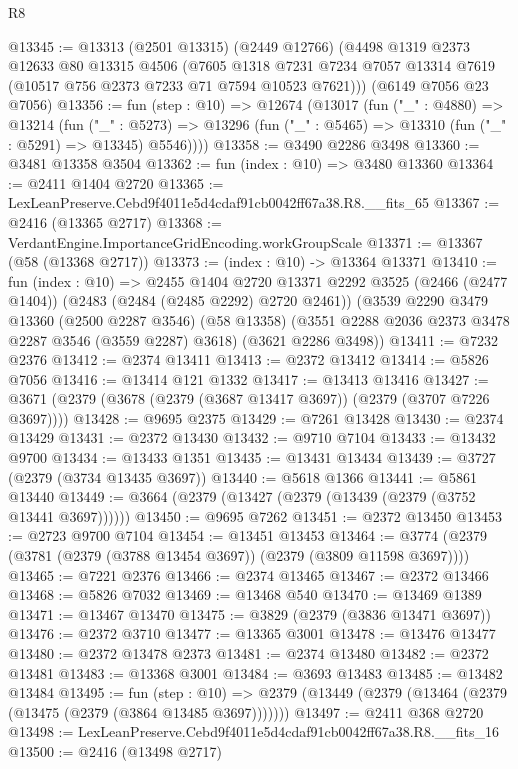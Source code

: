 \begin{lexlean}{R8}
\begin{coremodule}
@13345 := @13313
    (@2501 @13315)
    (@2449 @12766)
    (@4498
      @1319
      @2373
      @12633
      @80
      @13315
      @4506
      (@7605 @1318 @7231 @7234 @7057 @13314 @7619 (@10517 @756 @2373 @7233 @71 @7594 @10523 @7621)))
    (@6149 @7056 @23 @7056)
@13356 := fun (step : @10) =>
  @12674
    (@13017
      (fun ("_" : @4880) =>
      @13214
        (fun ("_" : @5273) =>
        @13296 (fun ("_" : @5465) => @13310 (fun ("_" : @5291) => @13345) @5546))))
@13358 := @3490 @2286 @3498
@13360 := @3481 @13358 @3504
@13362 := fun (index : @10) => @3480 @13360
@13364 := @2411 @1404 @2720
@13365 := LexLeanPreserve.Cebd9f4011e5d4cdaf91cb0042ff67a38.R8.__fits_65
@13367 := @2416 (@13365 @2717)
@13368 := VerdantEngine.ImportanceGridEncoding.workGroupScale
@13371 := @13367 (@58 (@13368 @2717))
@13373 := (index : @10) -> @13364 @13371
@13410 := fun (index : @10) =>
  @2455
    @1404
    @2720
    @13371
    @2292
    @3525
    (@2466 (@2477 @1404))
    (@2483 (@2484 (@2485 @2292) @2720 @2461))
    (@3539
      @2290
      @3479
      @13360
      (@2500 @2287 @3546)
      (@58 @13358)
      (@3551 @2288 @2036 @2373 @3478 @2287 @3546 (@3559 @2287) @3618)
      (@3621 @2286 @3498))
@13411 := @7232 @2376
@13412 := @2374 @13411
@13413 := @2372 @13412
@13414 := @5826 @7056
@13416 := @13414 @121 @1332
@13417 := @13413 @13416
@13427 := @3671 (@2379 (@3678 (@2379 (@3687 @13417 @3697)) (@2379 (@3707 @7226 @3697))))
@13428 := @9695 @2375
@13429 := @7261 @13428
@13430 := @2374 @13429
@13431 := @2372 @13430
@13432 := @9710 @7104
@13433 := @13432 @9700
@13434 := @13433 @1351
@13435 := @13431 @13434
@13439 := @3727 (@2379 (@3734 @13435 @3697))
@13440 := @5618 @1366
@13441 := @5861 @13440
@13449 := @3664 (@2379 (@13427 (@2379 (@13439 (@2379 (@3752 @13441 @3697))))))
@13450 := @9695 @7262
@13451 := @2372 @13450
@13453 := @2723 @9700 @7104
@13454 := @13451 @13453
@13464 := @3774 (@2379 (@3781 (@2379 (@3788 @13454 @3697)) (@2379 (@3809 @11598 @3697))))
@13465 := @7221 @2376
@13466 := @2374 @13465
@13467 := @2372 @13466
@13468 := @5826 @7032
@13469 := @13468 @540
@13470 := @13469 @1389
@13471 := @13467 @13470
@13475 := @3829 (@2379 (@3836 @13471 @3697))
@13476 := @2372 @3710
@13477 := @13365 @3001
@13478 := @13476 @13477
@13480 := @2372 @13478 @2373
@13481 := @2374 @13480
@13482 := @2372 @13481
@13483 := @13368 @3001
@13484 := @3693 @13483
@13485 := @13482 @13484
@13495 := fun (step : @10) =>
  @2379 (@13449 (@2379 (@13464 (@2379 (@13475 (@2379 (@3864 @13485 @3697)))))))
@13497 := @2411 @368 @2720
@13498 := LexLeanPreserve.Cebd9f4011e5d4cdaf91cb0042ff67a38.R8.__fits_16
@13500 := @2416 (@13498 @2717)

\end{coremodule}
\end{lexlean}
